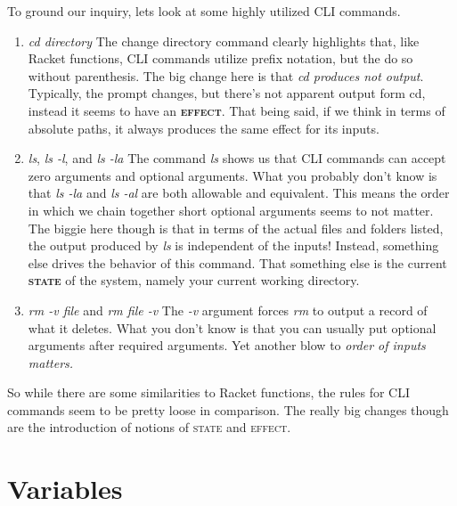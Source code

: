 \documentclass[]{tufte-handout}
\begin{document}
To ground our inquiry, lets look at some highly utilized CLI commands.
\begin{enumerate}
\item \textit{cd \textit{directory}} \newline
The change directory command clearly highlights that, like Racket functions, CLI commands utilize prefix notation, but the do so without parenthesis. The big change here is that \textit{cd produces not output}.  Typically, the prompt changes, but there's not apparent output form cd, instead it seems to have an \textsc{\textbf{effect}}.  That being said, if we think in terms of absolute paths, it always produces the same effect for its inputs. 

\item \textit{ls}, \textit{ls -l}, and \textit{ls -la} \newline
The command \textit{ls} shows us that CLI commands can accept zero arguments and optional arguments.  What you probably don't know is that \textit{ls -la} and \textit{ls -al}  are both allowable and equivalent.  This means the order in which we chain together short optional arguments seems to not matter.  The biggie here though is that in terms of the actual files and folders listed, the output produced by \textit{ls} is independent of the inputs! Instead, something else drives the behavior of this command. That something else is the current \textbf{\textsc{state}} of the system, namely your current working directory. 

\item \textit{rm -v \textit{file}} and \textit{rm \textit{file} -v} \newline
The \textit{-v} argument forces \textit{rm} to output a record of what it deletes.  What you don't know is that you can usually put optional arguments after required arguments. Yet another blow to \textit{order of inputs matters.}  
\end{enumerate}

So while there are some similarities to Racket functions, the rules for CLI commands seem to be pretty loose in comparison.  The really big changes though are the introduction of notions of \textsc{state} and \textsc{effect}.


\section{Variables}
\end{document}
